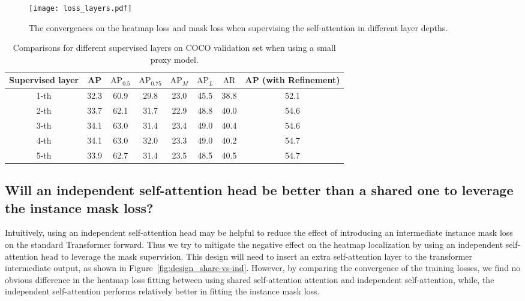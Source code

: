\documentclass{article} \usepackage{iclr_conference,times}
\begin{document}
\begin{figure}[h]
	\centering
	\texttt{[image: loss\_layers.pdf]}
	\caption{The convergences on the heatmap loss and mask loss when supervising the self-attention in different layer depths.}
	\label{fig:layer-depth}
\end{figure}

\begin{table}[h]\small
	\centering
	\begin{tabular}{cccccccc}
		\toprule
		Supervised layer & AP & $\text{AP}_{0.5}$ & $\text{AP}_{0.75}$ & $\text{AP}_{M}$ & $\text{AP}_{L}$ & $\text{AR}$& AP (with Refinement)\\
		\midrule
		1-th & 32.3 & 60.9& 29.8& 23.0& 45.5 & 38.8 & 52.1\\
		2-th & 33.7 & 62.1& 31.7& 22.9& 48.8 & 40.0 & 54.6\\
		3-th & 34.1 & 63.0& 31.4& 23.4& 49.0 & 40.4 & 54.6\\
		4-th & 34.1 & 63.0& 32.0& 23.3& 49.0 & 40.2 & 54.7\\
		5-th & 33.9 & 62.7& 31.4& 23.5& 48.5 & 40.5 & 54.7\\
		\toprule
	\end{tabular}
	\caption{Comparisons for different supervised layers on COCO validation set when using a small proxy model.}
	\label{tab:layers}
\end{table}


\subsection{Will an independent self-attention head be better than a shared one to leverage the instance mask loss?} 

Intuitively, using an independent self-attention head may be helpful to reduce the effect of introducing an intermediate instance mask loss on the standard Transformer forward. Thus we try to mitigate the negative effect on the heatmap localization by using an independent self-attention head to leverage the mask supervision. This design will need to insert an extra self-attention layer to the transformer intermediate output, as shown in Figure~\ref{fig:design_share-vs-ind}. However, by comparing the convergence of the training losses, we find no obvious difference in the heatmap loss fitting between using shared self-attention attention and independent self-attention, while, the independent self-attention performs relatively better in fitting the instance mask loss. 
\end{document}
